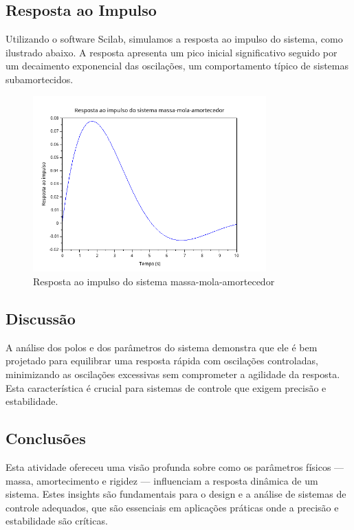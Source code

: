 \subsection{Resposta ao Impulso}
Utilizando o software Scilab, simulamos a resposta ao impulso do sistema, como ilustrado abaixo. A resposta apresenta um pico inicial significativo seguido por um decaimento exponencial das oscilações, um comportamento típico de sistemas subamortecidos.
\begin{figure}[H]
    \centering
    \includegraphics[width=0.8\textwidth]{atividades/3-atividade/assets/resposta-ao-impulso.png}
    \caption{Resposta ao impulso do sistema massa-mola-amortecedor}
\end{figure}

\subsection{Discussão}
A análise dos polos e dos parâmetros do sistema demonstra que ele é bem projetado para equilibrar uma resposta rápida com oscilações controladas, minimizando as oscilações excessivas sem comprometer a agilidade da resposta. Esta característica é crucial para sistemas de controle que exigem precisão e estabilidade.

\subsection{Conclusões}
Esta atividade ofereceu uma visão profunda sobre como os parâmetros físicos — massa, amortecimento e rigidez — influenciam a resposta dinâmica de um sistema. Estes insights são fundamentais para o design e a análise de sistemas de controle adequados, que são essenciais em aplicações práticas onde a precisão e estabilidade são críticas.
